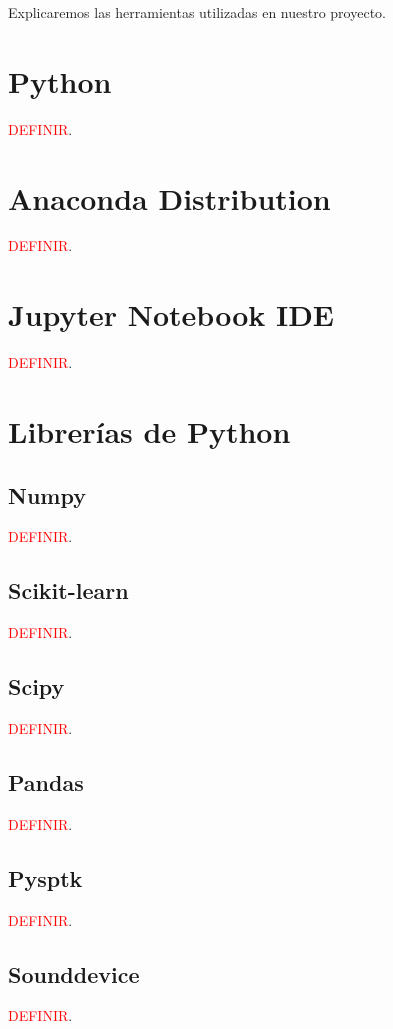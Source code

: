
Explicaremos las herramientas utilizadas en nuestro proyecto.

\section{Python}
\textcolor{red}{DEFINIR}.

\section{Anaconda Distribution}
\textcolor{red}{DEFINIR}.

\section{Jupyter Notebook IDE}
\textcolor{red}{DEFINIR}.

\section{Librerías de Python}
\subsection{Numpy}
\textcolor{red}{DEFINIR}.

\subsection{Scikit-learn}
\textcolor{red}{DEFINIR}.

\subsection{Scipy}
\textcolor{red}{DEFINIR}.

\subsection{Pandas}
\textcolor{red}{DEFINIR}.

\subsection{Pysptk}
\textcolor{red}{DEFINIR}.

\subsection{Sounddevice}
\textcolor{red}{DEFINIR}.

